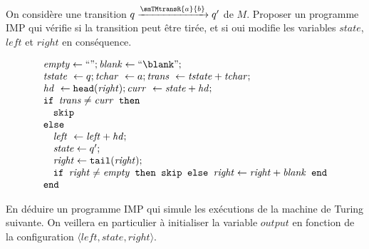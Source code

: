 \begin{exercice}
  \begin{questions}
  \item On considère une transition $ q\xrightarrow{\smTMtransR{a}{b}} q'$ de $M$.
    Proposer un programme IMP qui vérifie si la transition peut être tirée,
    et si oui modifie les variables $\mathit{state}$, $\mathit{left}$ et $\mathit{right}$
    en conséquence.
  \end{questions}
  \begin{corrections}
    $$\begin{array}{l}
      \mathit{empty} \leftarrow ``" ; \mathit{blank} \leftarrow ``\blank" ;\\
      \mathit{tstate}~\leftarrow q ;
      \mathit{tchar}~\leftarrow a ;
      \mathit{trans}~\leftarrow \mathit{tstate} + \mathit{tchar} ;\\
      \mathit{hd}~\leftarrow \texttt{head}(\mathit{right}) ;
      \mathit{curr}~\leftarrow \mathit{state} + \mathit{hd} ;\\
      \texttt{if }\mathit{trans} \neq \mathit{curr} \texttt{ then }\\
      \quad \texttt{skip} \\
      \texttt{else} \\
      \quad \mathit{left}~ \leftarrow \mathit{left} + \mathit{hd} ;\\
      \quad \mathit{state} \leftarrow q' ;\\
      \quad \mathit{right} \leftarrow \texttt{tail}(\mathit{right}) ;\\
      \quad \texttt{if }\mathit{right} \neq \mathit{empty} \texttt{ then skip else } \mathit{right} \leftarrow \mathit{right} + \mathit{blank} \texttt{ end}\\
      \texttt{end}
    \end{array}$$
  \end{corrections}
  
  \begin{questions}
  \item En déduire un programme IMP qui simule les exécutions de la machine de Turing suivante.
    On veillera en particulier à initialiser la variable $\mathit{output}$
    en fonction de la configuration $\langle \mathit{left}, \mathit{state}, \mathit{right} \rangle$.
    
  \end{questions}
  \begin{corrections}


\end{corrections}
\end{exercice}
